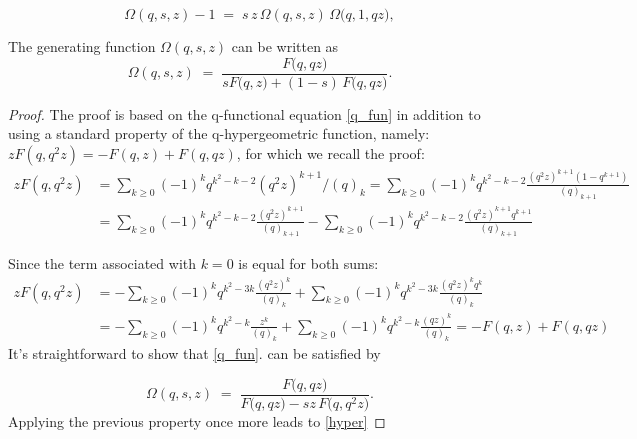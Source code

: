 \documentclass[10pt,a4paper]{amsart}
\begin{document}
\begin{equation}\label{q_fun}
  \Omega(q,s,z)-1 \;=\; s\,z\,\Omega(q,s,z)\,\Omega\!\bigl(q,1,qz\bigr),
\end{equation}

\begin{lemma}\label{Ram}
The generating function \(\Omega(q,s,z)\) can be written as
\begin{equation}\label{hyper}
  \Omega(q,s,z)\;=\;
  \frac{F\!\bigl(q,q z\bigr)}
       {s F\!\bigl(q,z\bigr)+(1-s)\,F\!\bigl(q,q z\bigr)}.
\end{equation}
\end{lemma}

\begin{proof}
The proof is based on the q-functional equation \ref{q_fun} in addition to using a standard property of the q-hypergeometric function, namely: $z F(q, q^2 z) = - F(q,z) + F(q,q z) $, for which we recall the proof:
\begin{align}
        z F(q, q^2 z) &= \sum_{k \geq 0} (-1)^k q^{k^2 - k -2} (q^2 z)^{k+1} /(q)_{k} = \sum_{k \geq 0} (-1)^k q^{k^2 - k -2}
    \frac{(q^2 z)^{k+1} (1-q^{k+1})}{(q)_{k+1}} \\
   &= \sum_{k \geq 0} (-1)^k q^{k^2 - k -2}
    \frac{(q^2 z)^{k+1} }{(q)_{k+1}}
    -
 \sum_{k \geq 0} (-1)^k q^{k^2 - k -2}
    \frac{(q^2 z)^{k+1} q^{k+1}} {(q)_{k+1}}
\end{align}

Since the term associated with $k=0$ is equal for both sums:
\begin{align}
        z F(q, q^2 z) &= -\sum_{k \geq 0} (-1)^k q^{k^2 - 3 k}
    \frac{(q^2 z)^{k} }{(q)_{k}}
    +
 \sum_{k \geq 0} (-1)^k q^{k^2 - 3 k}
    \frac{(q^2 z)^{k} q^{k}} {(q)_{k}} \\
 &= -\sum_{k \geq 0} (-1)^k q^{k^2 -  k}
    \frac{z^{k} }{(q)_{k}}
    +
 \sum_{k \geq 0} (-1)^k q^{k^2 -  k}
    \frac{(q z)^{k}} {(q)_{k}} =
     -
    F(q,z)
    +
 F(q,q z) 
\end{align}
It's straightforward to show that \ref{q_fun}.
can be satisfied by 

\begin{equation}
  \Omega(q,s,z)\;=\;
  \frac{F\!\bigl(q,qz\bigr)}
       {F\!\bigl(q,qz\bigr)-sz\,F\!\bigl(q,q^2 z\bigr)}.
\end{equation}
Applying the previous property once more leads to  \ref{hyper} 
\end{proof}
\end{document}
